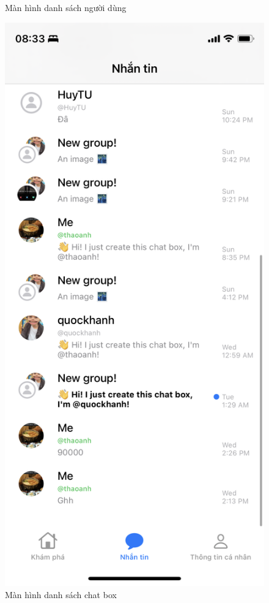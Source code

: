 \documentclass[../DoAn.tex]{subfiles}
\begin{document}
\begin{figure}[H]
\begin{minipage}{0.5\textwidth}
\caption{Màn hình danh sách người dùng} \label{fig:screen_login}
\end{minipage}
\hspace{\fill}
\begin{minipage}{0.5\textwidth}
\includegraphics[width=0.95\linewidth]{Hinhve/Application/Chatbox.png}
\caption{Màn hình danh sách chat box} \label{fig:list_task}
\end{minipage}
\end{figure}
\end{document}
